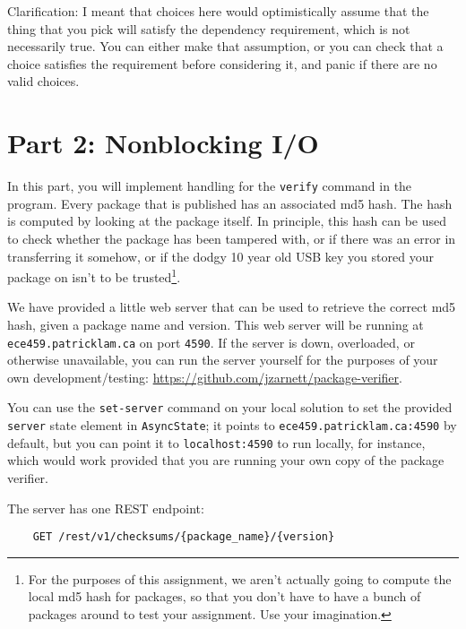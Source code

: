 \documentclass[12pt]{article}
\renewcommand{\_}{\kern-1.5pt\textunderscore\kern-1.5pt}
\begin{document}
\vspace{1em}
Clarification: I meant that choices here would optimistically assume that the thing that you pick will satisfy the dependency requirement, which is not necessarily true. You can either make that assumption, or you can check that a choice satisfies the requirement before considering it, and panic if there are no valid choices.



\vspace{\baselineskip}
\section*{Part 2: Nonblocking I/O }\par

In this part, you will implement handling for the \texttt{verify} command in the program. Every package that is published has an associated md5 hash. The hash is computed by looking at the package itself. In principle, this hash can be used to check whether the package has been tampered with, or if there was an error in transferring it somehow, or if the dodgy 10 year old USB key you stored your package on isn't to be trusted\footnote{For the purposes of this assignment, we aren't actually going to compute the local md5 hash for packages, so that you don't have to have a bunch of packages around to test your assignment. Use your imagination.}.\par

\vspace{1em}
We have provided a little web server that can be used to retrieve the correct md5 hash, given a package name and version. This web server will be running at \texttt{ece459.patricklam.ca} on port \texttt{4590}. If the server is down, overloaded, or otherwise unavailable, you can run the server yourself for the purposes of your own development/testing: \url{https://github.com/jzarnett/package-verifier}. 

\vspace{1em}
You can use the \texttt{set-server} command on your local solution to set the provided \texttt{server} state element in \texttt{AsyncState}; it points to \texttt{ece459.patricklam.ca:4590} by default, but you can point it to \texttt{localhost:4590} to run locally, for instance, which would work provided that you are running your own copy of the package verifier. \par 

\vspace{1em}
The server has one REST endpoint: 
\begin{verbatim}
    GET /rest/v1/checksums/{package_name}/{version}
\end{verbatim}
\end{document}
